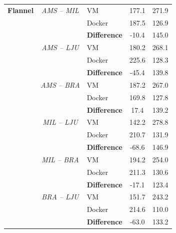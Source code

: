 \begin{appendices}
\begin{longtable}{@{\extracolsep{\fill}}lclcc@{}}
\textbf{Flannel} & \textit{AMS – MIL} & {\color[HTML]{333333} VM} & 177.1 & 271.9 \\
 & \textit{} & {\color[HTML]{333333} Docker} & 187.5 & 126.9 \\ \cmidrule(l){3-5} 
 & \textit{} & {\color[HTML]{333333} \textbf{Difference}} & {\color[HTML]{CB0000} -10.4} & {\color[HTML]{009901} 145.0} \\ \cmidrule(l){2-5} 
 & \textit{AMS – LJU} & {\color[HTML]{333333} VM} & 180.2 & 268.1 \\
 & \textit{} & {\color[HTML]{333333} Docker} & 225.6 & 128.3 \\ \cmidrule(l){3-5} 
 & \textit{} & {\color[HTML]{333333} \textbf{Difference}} & {\color[HTML]{CB0000} -45.4} & {\color[HTML]{009901} 139.8} \\ \cmidrule(l){2-5} 
 & \textit{AMS – BRA} & {\color[HTML]{333333} VM} & 187.2 & 267.0 \\
 & \textit{} & {\color[HTML]{333333} Docker} & 169.8 & 127.8 \\ \cmidrule(l){3-5} 
 &  & {\color[HTML]{333333} \textbf{Difference}} & {\color[HTML]{009901} 17.4} & {\color[HTML]{009901} 139.2} \\ \cmidrule(l){2-5} 
 & \textit{MIL – LJU} & {\color[HTML]{333333} VM} & 142.2 & 278.8 \\
 & \textit{} & {\color[HTML]{333333} Docker} & 210.7 & 131.9 \\
 & \textit{} & {\color[HTML]{333333} \textbf{Difference}} & {\color[HTML]{CB0000} -68.6} & {\color[HTML]{009901} 146.9} \\ \cmidrule(l){2-5} 
 & \textit{MIL – BRA} & {\color[HTML]{333333} VM} & 194.2 & 254.0 \\
 & \textit{} & {\color[HTML]{333333} Docker} & 211.3 & 130.6 \\ \cmidrule(l){3-5} 
 & \textit{} & {\color[HTML]{333333} \textbf{Difference}} & {\color[HTML]{CB0000} -17.1} & {\color[HTML]{009901} 123.4} \\ \cmidrule(l){2-5} 
 & \textit{BRA – LJU} & {\color[HTML]{333333} VM} & 151.7 & 243.2 \\
 &  & {\color[HTML]{333333} Docker} & 214.6 & 110.0 \\ \cmidrule(l){3-5} 
 &  & {\color[HTML]{333333} \textbf{Difference}} & {\color[HTML]{CB0000} -63.0} & {\color[HTML]{333333} 133.2} \\ \bottomrule
\end{longtable}

\newpage

\end{appendices}
